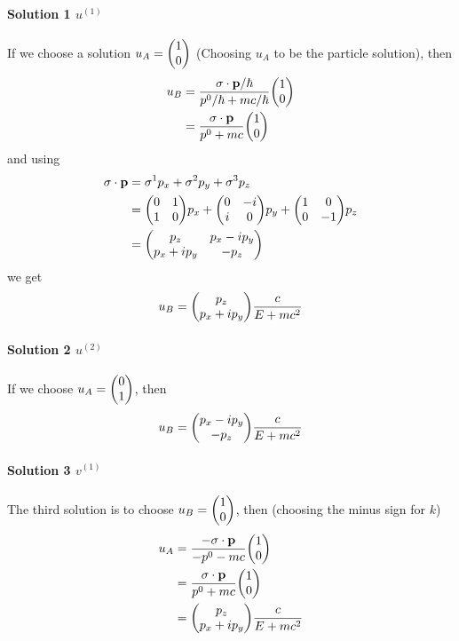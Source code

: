 \documentclass[../main.tex]{subfiles}
\begin{document}
\paragraph*{Solution 1 $u^{(1)}$}
If we choose a solution $u_A = \mqty(1 \\ 0)$ (Choosing $u_A$ to be the particle solution), then
\begin{align*}
    u_B &= \frac{\vb \sigma \cdot \vb p/ \hbar}{p^0/\hbar + mc/\hbar} \mqty(1 \\ 0) \\
    &= \frac{\vb \sigma \cdot \vb p}{p^0 + mc} \mqty(1 \\ 0) \\
\end{align*}
and using
\begin{align*}
    \vb \sigma \cdot \vb p &= \sigma^1 p_x + \sigma^2 p_y + \sigma^3 p_z \\
    &= \mqty(0 & 1 \\ 1 & 0) p_x + \mqty(0 & -i \\ i & 0) p_y + \mqty(1 & 0 \\ 0 & -1) p_z \\
    &= \mqty(p_z & p_x - i p_y \\ p_x + i p_y & -p_z)
\end{align*}
we get 
\begin{align*}
    u_B = \mqty(p_z \\ p_x + ip_y) \frac{c}{E + mc^2}
\end{align*}
\paragraph*{Solution 2 $u^{(2)}$}
If we choose $u_A = \mqty(0 \\ 1)$, then
\begin{align*}
    u_B = \mqty(p_x - i p_y \\ -p_z) \frac{c}{E + mc^2}
\end{align*}
\paragraph*{Solution 3 $v^{(1)}$}
The third solution is to choose $u_B = \mqty(1 \\ 0)$, then (choosing the minus sign for $k$)
\begin{align*}
    u_A &= \frac{-\vb \sigma \cdot \vb p}{-p^0 - mc} \mqty(1 \\ 0) \\
    &= \frac{\vb \sigma \cdot \vb p}{p^0 + mc} \mqty(1 \\ 0) \\
    &= \mqty(p_z \\ p_x + i p_y) \frac{c}{E + mc^2}
\end{align*}
\end{document}
